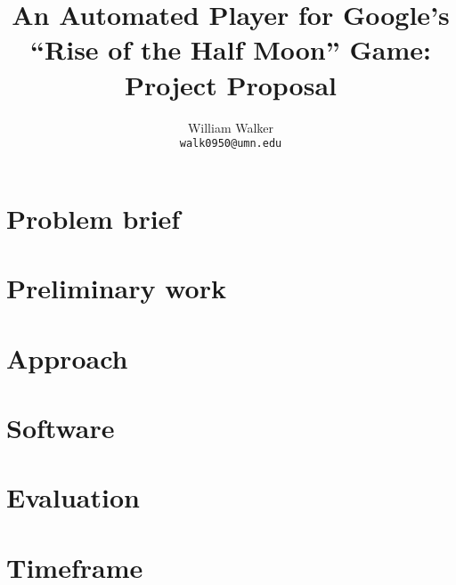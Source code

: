 \documentclass[11pt]{article}
\title{An Automated Player for Google's ``Rise of the Half Moon'' Game: Project Proposal}
\author{William Walker \\
  \texttt{walk0950@umn.edu} }
\begin{document}
\pagestyle{fancy}
\fancyhead{} %
\fancyfoot{} %
\fancyfoot[R]{\small\thepage}

\maketitle



\section{Problem brief}

\cite{Google:2024:HalfMoon}


\section{Preliminary work}
\section{Approach}
\section{Software}
\section{Evaluation}
\section{Timeframe}




\end{document}
